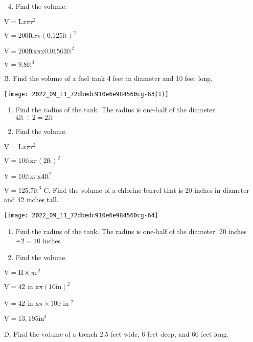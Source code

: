 \begin{enumerate}
  \setcounter{enumi}{3}
  \item Find the volume.
\end{enumerate}
$\mathrm{V}=\mathrm{L} x \pi \mathrm{r}^{2}$

$\mathrm{V}=200 \mathrm{ft} x \pi(0.125 \mathrm{ft})^{2}$

$\mathrm{V}=200 \mathrm{ft} \mathrm{x} \pi \mathrm{x} 0.01563 \mathrm{ft}^{2}$

$\mathrm{V}=9.8 \mathrm{ft}^{3}$

B. Find the volume of a fuel tank 4 feet in diameter and 10 feet long.

\texttt{[image: 2022\_09\_11\_72dbedc910e6e984560cg-63(1)]}

\begin{enumerate}
  \item Find the radius of the tank. The radius is one-half of the diameter. $4 \mathrm{ft} \div 2=2 \mathrm{ft}$

  \item Find the volume.

\end{enumerate}
$\mathrm{V}=\mathrm{L} x \pi \mathrm{r}^{2}$

$\mathrm{V}=10 \mathrm{ft} \mathrm{x} \pi(2 \mathrm{ft})^{2}$

$\mathrm{V}=10 \mathrm{ft} \mathrm{x} \pi \mathrm{x} 4 \mathrm{ft}^{2}$

$\mathrm{V}=125.7 \mathrm{ft}^{3}$ C. Find the volume of a chlorine barrel that is 20 inches in diameter and 42 inches tall.

\texttt{[image: 2022\_09\_11\_72dbedc910e6e984560cg-64]}

\begin{enumerate}
  \item Find the radius of the tank. The radius is one-half of the diameter. 20 inches $\div 2=10$ inches

  \item Find the volume.

\end{enumerate}
$\mathrm{V}=\mathrm{H} \times \pi \mathrm{r}^{2}$

$\mathrm{V}=42$ in $\mathrm{x} \pi(10 \mathrm{in})^{2}$

$\mathrm{V}=42$ in $\mathrm{x} \pi \times 100$ in $^{2}$

$\mathrm{V}=13,195 \mathrm{in}^{3}$

D. Find the volume of a trench $2.5$ feet wide, 6 feet deep, and 60 feet long.

